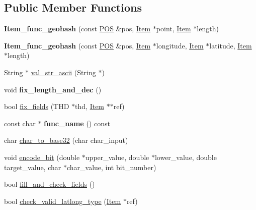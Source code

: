 \subsection*{Public Member Functions}
\begin{DoxyCompactItemize}
\item 
\mbox{\label{classItem__func__geohash_afec4b55fc30c255c3cbb1a78a69dea64}} 
{\bfseries Item\+\_\+func\+\_\+geohash} (const \mbox{\hyperlink{structYYLTYPE}{P\+OS}} \&pos, \mbox{\hyperlink{classItem}{Item}} $\ast$point, \mbox{\hyperlink{classItem}{Item}} $\ast$length)
\item 
\mbox{\label{classItem__func__geohash_a270d5a3d94978782e0bc0d42b373ef1e}} 
{\bfseries Item\+\_\+func\+\_\+geohash} (const \mbox{\hyperlink{structYYLTYPE}{P\+OS}} \&pos, \mbox{\hyperlink{classItem}{Item}} $\ast$longitude, \mbox{\hyperlink{classItem}{Item}} $\ast$latitude, \mbox{\hyperlink{classItem}{Item}} $\ast$length)
\item 
String $\ast$ \mbox{\hyperlink{classItem__func__geohash_a460112e8fbbf5494c4a6cbf969f87013}{val\+\_\+str\+\_\+ascii}} (String $\ast$)
\item 
\mbox{\label{classItem__func__geohash_ad5a28836196906c2b11b6c4d27ee4d8d}} 
void {\bfseries fix\+\_\+length\+\_\+and\+\_\+dec} ()
\item 
bool \mbox{\hyperlink{classItem__func__geohash_a55985b35b8f0607b19b7490e99704461}{fix\+\_\+fields}} (T\+HD $\ast$thd, \mbox{\hyperlink{classItem}{Item}} $\ast$$\ast$ref)
\item 
\mbox{\label{classItem__func__geohash_aecb69fe1c4dbcbebe248d153d741fd75}} 
const char $\ast$ {\bfseries func\+\_\+name} () const
\item 
char \mbox{\hyperlink{classItem__func__geohash_a1fbadf1b1b984bba02477c0c25c39aea}{char\+\_\+to\+\_\+base32}} (char char\+\_\+input)
\item 
void \mbox{\hyperlink{classItem__func__geohash_a3f7bb8e49f769efc0a9a70d5b35bd13c}{encode\+\_\+bit}} (double $\ast$upper\+\_\+value, double $\ast$lower\+\_\+value, double target\+\_\+value, char $\ast$char\+\_\+value, int bit\+\_\+number)
\item 
bool \mbox{\hyperlink{classItem__func__geohash_a3b79d0bd1df6d3fdf5f92dd915bae2f6}{fill\+\_\+and\+\_\+check\+\_\+fields}} ()
\item 
bool \mbox{\hyperlink{classItem__func__geohash_a644fc7124d8c5332ed23a8519226f287}{check\+\_\+valid\+\_\+latlong\+\_\+type}} (\mbox{\hyperlink{classItem}{Item}} $\ast$ref)
\end{DoxyCompactItemize}
